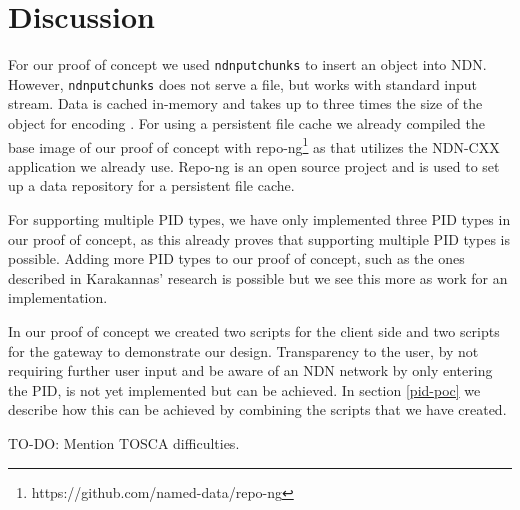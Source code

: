 \section{Discussion}\label{disc}



For our proof of concept we used \texttt{ndnputchunks} to insert an object into NDN. However, \texttt{ndnputchunks} does not serve a file, but works with standard input stream. Data is cached in-memory and takes up to three times the size of the object for encoding \cite{ndnput-mem}. For using a persistent file cache we already compiled the base image of our proof of concept with repo-ng\footnote{https://github.com/named-data/repo-ng} as that utilizes
the NDN-CXX application we already use. Repo-ng is an open source project and is used to set up a data repository for a persistent file cache.

For supporting multiple PID types, we have only implemented three PID types in our proof of concept, as this already proves that supporting multiple PID types is possible. Adding more PID types to our proof of concept, such as the ones described in Karakannas' research \cite{icn-bd} is possible but we see this more as work for an implementation.

In our proof of concept we created two scripts for the client side and two scripts for the gateway to demonstrate our design. Transparency to the user, by not requiring further user input and be aware of an NDN network by only entering the PID, is not yet implemented but can be achieved. In section \ref{pid-poc} we describe how this can be achieved by combining the scripts that we have created.


TO-DO: Mention TOSCA difficulties.
